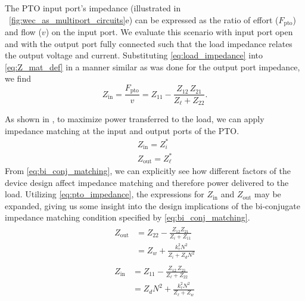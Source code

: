 \documentclass[lettersize,journal]{IEEEtran}
\begin{document}
The PTO input port's impedance (illustrated in \figurename~\ref{fig:wec_as_multiport_circuits}e) can be expressed as the ratio of effort ($F_{\textrm{pto}}$) and flow ($v$) on the input port.
We evaluate this scenario with input port open and with the output port fully connected such that the load impedance relates the output voltage and current.
Substituting \eqref{eq:load_impedance} into \eqref{eq:Z_mat_def} in a manner similar as was done for the output port impedance, we find
%
\begin{equation}
        Z_{\textrm{in}} = \frac{F_{\textrm{pto}}}{v}=  Z_{11} - \frac{Z_{12} \, Z_{21}}{Z_\ell + Z_{22}} .
        \label{eq:pto_input_port_impedance}
\end{equation}

As shown in  \cite{Bacelli:2021aa}, to maximize power transferred to the load, we can apply impedance matching at the input and output ports of the PTO.
%
\begin{subequations}
    \begin{align}
        Z_{\textrm{in}} = Z_i^*  \label{eq:bi_conj_matching_in} \\ 
        Z_{\textrm{out}} = Z_\ell^* \label{eq:bi_conj_matching_out}
    \end{align}
\label{eq:bi_conj_matching}%
\end{subequations}
%
From \eqref{eq:bi_conj_matching}, we can explicitly see how different factors of the device design affect impedance matching and therefore power delivered to the load.
Utilizing \eqref{eq:pto_impedance}, the expressions for $Z_{\textrm{in}}$ and $Z_{\textrm{out}}$ may be expanded, giving us some insight into the design implications of the bi-conjugate impedance matching condition specified by \eqref{eq:bi_conj_matching}.
%
\begin{subequations}
\begin{align}
        \begin{split}
                Z_{\textrm{out}} &=  Z_{22} - \frac{Z_{12} Z_{21}}{Z_{i} + Z_{11}} \\[0.5em]
                &=  Z_w + \frac{k_\tau^2 N^2}{Z_i + Z_d N^2}
        \end{split}\label{eq:expanded_zin} \\[1em]
        \begin{split}
                Z_{\textrm{in}} &= Z_{11} - \frac{Z_{12} \, Z_{21}}{Z_\ell + Z_{22}} \\[0.5em]
                &= Z_d N^2 + \frac{k_\tau^2 N^2}{Z_\ell + Z_w}
        \end{split}\label{eq:expanded_zout}
\end{align}\label{eq:expanded_z}%
\end{subequations}
\end{document}
